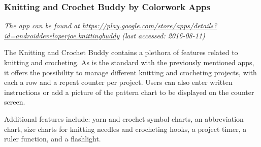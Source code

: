 \subsubsection*{Knitting and Crochet Buddy by Colorwork Apps}

\textit{ The app can be found at \url{https://play.google.com/store/apps/details?id=androiddeveloperjoe.knittingbuddy} \small{(last accessed: 2016-08-11)}}
\vspace*{0.5cm}

\noindent The Knitting and Crochet Buddy contains a plethora of features related to knitting and crocheting. As is the standard with the previously mentioned apps, it offers the possibility to manage different knitting and crocheting projects, with each a row and a repeat counter per project. Users can also enter written instructions or add a picture of the pattern chart to be displayed on the counter screen.

Additional features include: yarn and crochet symbol charts, an abbreviation chart, size charts for knitting needles and crocheting hooks, a project timer, a ruler function, and a flashlight.

